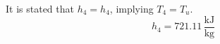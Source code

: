 It is stated that \(h_4 = h_4\), implying \(T_4 = T_u\).  
\[
h_4 = 721.11 \, \frac{\text{kJ}}{\text{kg}}
\]